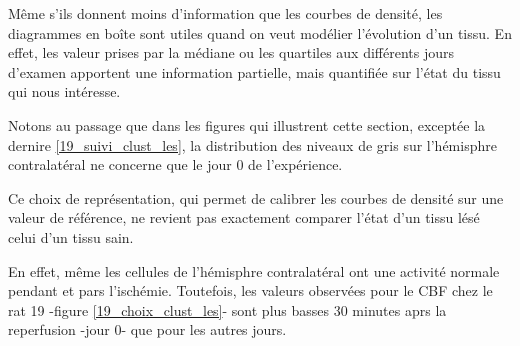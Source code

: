 \par
M\^eme s'ils donnent moins d'information que les courbes de densit\'e, les diagrammes en bo\^ite sont utiles quand on veut mod\'elier l'\'evolution d'un tissu. %
En effet, les valeur prises par la m\'ediane ou les quartiles aux diff\'erents jours d'examen apportent une information partielle, %
mais quantifi\'ee sur l'\'etat du tissu qui nous int\'eresse.

\par
Notons au passage que dans les figures qui illustrent cette section, except\'ee la dernire \ref{19_suivi_clust_les}, %
la distribution des niveaux de gris sur l'h\'emisphre contralat\'eral ne concerne que le jour 0 de l'exp\'erience.

\par
Ce choix de repr\'esentation, qui permet de calibrer les courbes de densit\'e sur une valeur de r\'ef\'erence, %
ne revient pas exactement  comparer l'\'etat d'un tissu l\'es\'e  celui d'un tissu sain.

\par
En effet, m\^eme les cellules de l'h\'emisphre contralat\'eral ont une activit\'e normale pendant et pars l'isch\'emie. %
Toutefois, les valeurs observ\'ees pour le CBF chez le rat 19 -figure \ref{19_choix_clust_les}- sont plus basses 30 minutes aprs la reperfusion -jour 0- %
que pour les autres jours.


